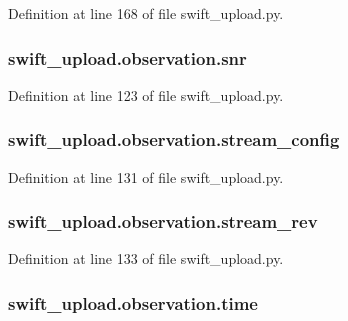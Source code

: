 Definition at line 168 of file swift\-\_\-upload.\-py.

\hypertarget{classswift__upload_1_1observation_af99687a759f84b56ed61f2c1b3688dd8}{
\subsubsection[{snr}]{\setlength{\rightskip}{0pt plus 5cm}swift\-\_\-upload.\-observation.\-snr}}\label{classswift__upload_1_1observation_af99687a759f84b56ed61f2c1b3688dd8}


Definition at line 123 of file swift\-\_\-upload.\-py.

\hypertarget{classswift__upload_1_1observation_a9596485585ce74140b825512aee37c79}{
\subsubsection[{stream\-\_\-config}]{\setlength{\rightskip}{0pt plus 5cm}swift\-\_\-upload.\-observation.\-stream\-\_\-config}}\label{classswift__upload_1_1observation_a9596485585ce74140b825512aee37c79}


Definition at line 131 of file swift\-\_\-upload.\-py.

\hypertarget{classswift__upload_1_1observation_a13b133ec0b17e5a5698be9fc66c012a7}{
\subsubsection[{stream\-\_\-rev}]{\setlength{\rightskip}{0pt plus 5cm}swift\-\_\-upload.\-observation.\-stream\-\_\-rev}}\label{classswift__upload_1_1observation_a13b133ec0b17e5a5698be9fc66c012a7}


Definition at line 133 of file swift\-\_\-upload.\-py.

\hypertarget{classswift__upload_1_1observation_a162639895089c8cbac963b1413ae8d6d}{
\subsubsection[{time}]{\setlength{\rightskip}{0pt plus 5cm}swift\-\_\-upload.\-observation.\-time}}\label{classswift__upload_1_1observation_a162639895089c8cbac963b1413ae8d6d}


